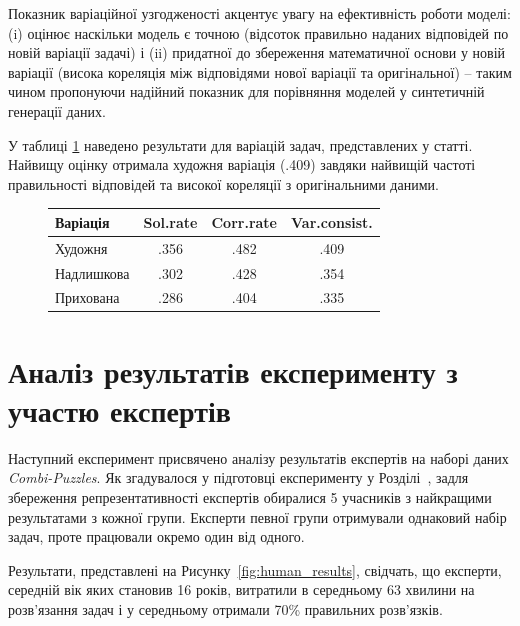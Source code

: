 Показник варіаційної узгодженості акцентує увагу на ефективність роботи моделі: (i) оцінює наскільки модель є точною (відсоток правильно наданих відповідей по новій варіації задачі) і (ii) придатної до збереження математичної основи у новій варіації (висока кореляція між відповідями нової варіації та оригінальної) -- таким чином пропонуючи надійний показник для порівняння моделей у синтетичній генерації даних.

У таблиці \ref{tab:f1} наведено результати для варіацій задач, представлених у статті. Найвищу оцінку отримала художня варіація (.409) завдяки найвищій частоті правильності відповідей та високої кореляції з оригінальними даними.

\begin{figure}
    \centering
    \label{tab:f1}
    \begin{tabular}{|l|c|c|c|}
        \hline
        \textbf{Варіація} & \textbf{Sol.rate} & \textbf{Corr.rate} & \textbf{Var.consist.} \\
        \hline
        Художня & .356 & .482 & .409 \\
        Надлишкова & .302 & .428 & .354 \\
        Прихована & .286 & .404 & .335 \\
        \hline
    \end{tabular}
\end{figure}

\section{Аналіз результатів експерименту з участю експертів}

Наступний експеримент присвячено аналізу результатів експертів на наборі даних \emph{Combi-Puzzles}. Як згадувалося у підготовці експерименту у Розділі~, задля збереження репрезентативності експертів обиралися 5 учасників з найкращими результатами з кожної групи. Експерти певної групи отримували однаковий набір задач, проте працювали окремо один від одного.

Результати, представлені на Рисунку~\ref{fig:human_results}, свідчать, що експерти, середній вік яких становив 16 років, витратили в середньому 63 хвилини на розв’язання задач і у середньому отримали 70\% правильних розв'язків.

